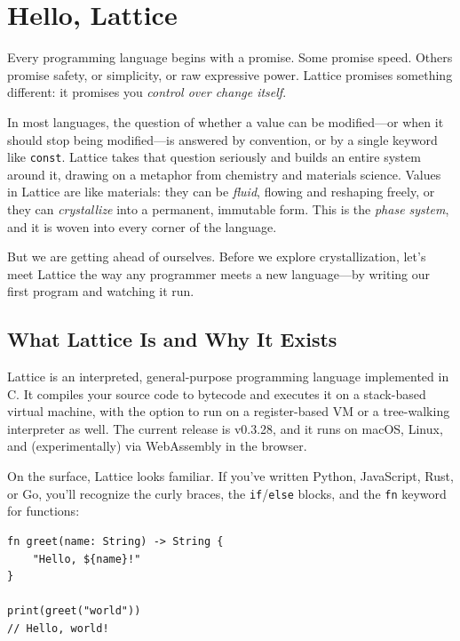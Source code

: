 \chapter{Hello, Lattice}\label{ch:hello-lattice}


Every programming language begins with a promise.
Some promise speed.
Others promise safety, or simplicity, or raw expressive power.
Lattice promises something different: it promises you \emph{control over change itself}.

In most languages, the question of whether a value can be modified---or when it should stop being modified---is answered by convention, or by a single keyword like \lstinline|const|.
Lattice takes that question seriously and builds an entire system around it, drawing on a metaphor from chemistry and materials science.
Values in Lattice are like materials: they can be \emph{fluid}, flowing and reshaping freely, or they can \emph{crystallize} into a permanent, immutable form.
This is the \emph{phase system}, and it is woven into every corner of the language.

But we are getting ahead of ourselves.
Before we explore crystallization, let's meet Lattice the way any programmer meets a new language---by writing our first program and watching it run.

\section{What Lattice Is and Why It Exists}\label{sec:what-is-lattice}

Lattice is an interpreted, general-purpose programming language implemented in C\@.
It compiles your source code to bytecode and executes it on a stack-based virtual machine, with the option to run on a register-based VM or a tree-walking interpreter as well.
The current release is v0.3.28, and it runs on macOS, Linux, and (experimentally) via WebAssembly in the browser.

On the surface, Lattice looks familiar.
If you've written Python, JavaScript, Rust, or Go, you'll recognize the curly braces, the \lstinline|if|/\lstinline|else| blocks, and the \lstinline|fn| keyword for functions:

\begin{lstlisting}[language=Lattice, caption={A first glance at Lattice syntax}]
fn greet(name: String) -> String {
    "Hello, ${name}!"
}

print(greet("world"))
// Hello, world!
\end{lstlisting}

